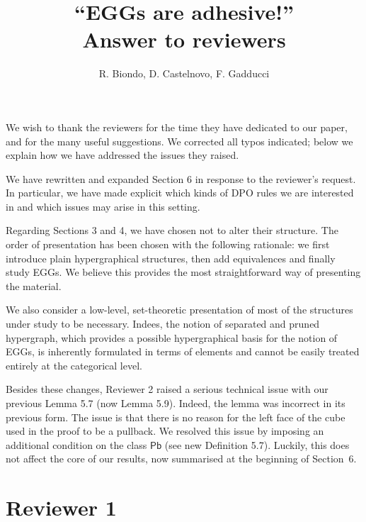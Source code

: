 \documentclass[english,11pt,a4paper]{article}
\title{``EGGs are adhesive!''\\
	Answer to reviewers}
\author{R. Biondo, D. Castelnovo, F. Gadducci}
\begin{document}
	\maketitle
	
	
We wish to thank the reviewers for the time they have dedicated to our paper, and for the many useful suggestions. We corrected all typos indicated; below we explain how we have addressed the issues they raised.

We have rewritten and expanded Section 6 in response to the reviewer's request. In particular, we have made explicit which kinds of DPO rules we are interested in and which issues may arise in this setting.

Regarding Sections 3 and 4, we have chosen not to alter their structure. The order of presentation has been chosen with the following rationale: we first introduce plain hypergraphical structures, then add equivalences and finally study EGGs. We believe this provides the most straightforward way of presenting the material.

We also consider a low-level, set-theoretic presentation of most of the structures under study to be necessary. Indees, the notion of separated and pruned hypergraph, which provides a possible hypergraphical basis for the notion of EGGs, is inherently formulated in terms of elements and cannot be easily treated entirely at the categorical level.

Besides these changes, Reviewer 2 raised a serious technical issue with our previous Lemma 5.7 (now Lemma 5.9).  Indeed, the lemma was incorrect in its previous form. The issue is that there is no reason for the left face of the cube used in the proof to be a pullback. We resolved this issue by imposing an additional condition on the class $\mathsf{Pb}$ (see new Definition 5.7). Luckily, this does not affect the core of our results, now summarised 
at the beginning of Section~6.


\section*{Reviewer 1}
\end{document}
